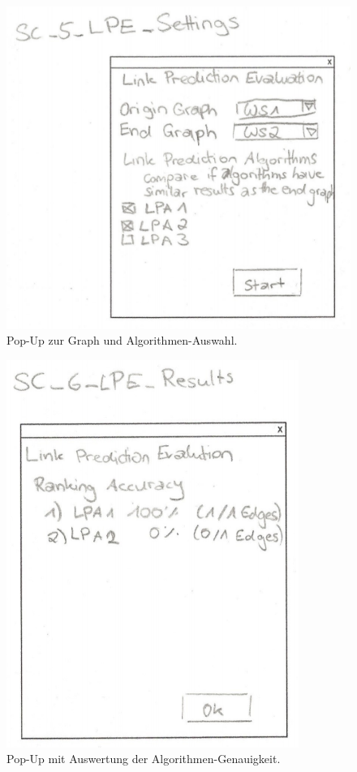 \begin{figure}
    \includegraphics[width=\linewidth]{resources/EV-3.png}
    \caption{Pop-Up zur Graph und Algorithmen-Auswahl.}
    \label{fig:screen9}
\end{figure}

\begin{figure}
    \includegraphics[width=\linewidth]{resources/EV-4.png}
    \caption{Pop-Up mit Auswertung der Algorithmen-Genauigkeit.}
    \label{fig:screen10}
\end{figure}

